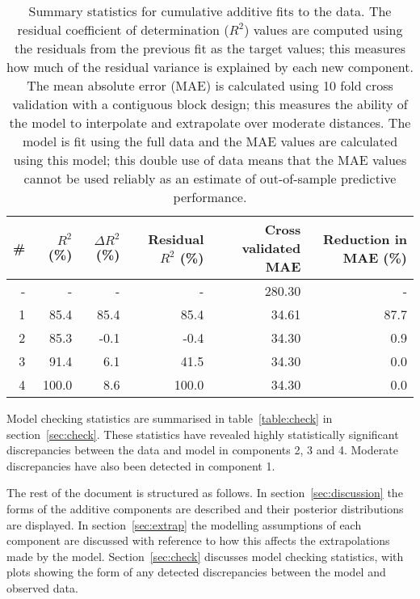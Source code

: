 \documentclass{article} %
\begin{document}
\begin{table}[htb]
\begin{center}
{\small
\begin{tabular}{|r|rrrrr|}
\hline
\bf{\#} & {$R^2$ (\%)} & {$\Delta R^2$ (\%)} & {Residual $R^2$ (\%)} & {Cross validated MAE} & Reduction in MAE (\%)\\
\hline
- & - & - & - & 280.30 & -\\

1 & 85.4 & 85.4 & 85.4 & 34.61 & 87.7\\

2 & 85.3 & -0.1 & -0.4 & 34.30 & 0.9\\

3 & 91.4 & 6.1 & 41.5 & 34.30 & 0.0\\

4 & 100.0 & 8.6 & 100.0 & 34.30 & 0.0\\

\hline
\end{tabular}
\caption{
Summary statistics for cumulative additive fits to the data.
The residual coefficient of determination ($R^2$) values are computed using the residuals from the previous fit as the target values; this measures how much of the residual variance is explained by each new component.
The mean absolute error (MAE) is calculated using 10 fold cross validation with a contiguous block design; this measures the ability of the model to interpolate and extrapolate over moderate distances.
The model is fit using the full data and the MAE values are calculated using this model; this double use of data means that the MAE values cannot be used reliably as an estimate of out-of-sample predictive performance.
}
\label{table:stats}
}
\end{center}
\end{table}

Model checking statistics are summarised in table~\ref{table:check} in section~\ref{sec:check}.
These statistics have revealed highly statistically significant discrepancies between the data and model in components 2, 3 and 4.
Moderate discrepancies have also been detected in component 1.

The rest of the document is structured as follows.
In section~\ref{sec:discussion} the forms of the additive components are described and their posterior distributions are displayed.
In section~\ref{sec:extrap} the modelling assumptions of each component are discussed with reference to how this affects the extrapolations made by the model.
Section~\ref{sec:check} discusses model checking statistics, with plots showing the form of any detected discrepancies between the model and observed data.
\end{document}
